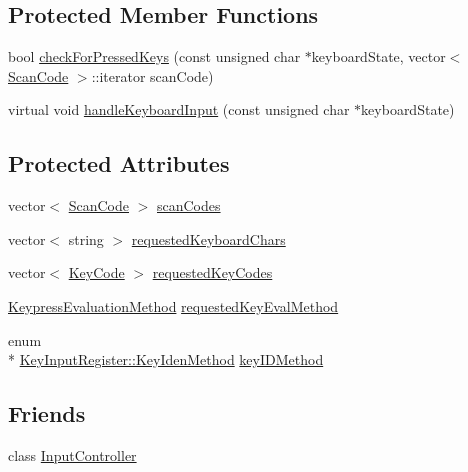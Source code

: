 \subsection*{Protected Member Functions}
\begin{DoxyCompactItemize}
\item 
bool \hyperlink{class_key_input_register_a0e5993cb2e93f288a4acf7d34da6edad}{check\-For\-Pressed\-Keys} (const unsigned char $\ast$keyboard\-State, vector$<$ \hyperlink{_input_8hpp_ab11de2748648ed8559e324a4b8dfb2da}{Scan\-Code} $>$\-::iterator scan\-Code)
\item 
virtual void \hyperlink{class_key_input_register_a076a886cd83efe7d7aaa11f670d75e61}{handle\-Keyboard\-Input} (const unsigned char $\ast$keyboard\-State)
\end{DoxyCompactItemize}
\subsection*{Protected Attributes}
\begin{DoxyCompactItemize}
\item 
vector$<$ \hyperlink{_input_8hpp_ab11de2748648ed8559e324a4b8dfb2da}{Scan\-Code} $>$ \hyperlink{class_key_input_register_abc2af3b54d196eda9e64fdcd6da118d0}{scan\-Codes}
\item 
vector$<$ string $>$ \hyperlink{class_key_input_register_a6ff79253202f3106320ed21e9f3eb803}{requested\-Keyboard\-Chars}
\item 
vector$<$ \hyperlink{_input_8hpp_ad39c2e59d8cf6782d7ab90b73c0d0ada}{Key\-Code} $>$ \hyperlink{class_key_input_register_a15cc8379e648634a63e1bedd645d03c3}{requested\-Key\-Codes}
\item 
\hyperlink{_input_8hpp_ac32d0351518cb71146a1cd777bc4fc91}{Keypress\-Evaluation\-Method} \hyperlink{class_key_input_register_a99a156d91abafbd8a1f191d15158d1ba}{requested\-Key\-Eval\-Method}
\item 
enum \\*
\hyperlink{class_key_input_register_a21a7be17fdf11de9736f801ed23b3d5d}{Key\-Input\-Register\-::\-Key\-Iden\-Method} \hyperlink{class_key_input_register_adf60b0b21fcd0b52bf3c505528519b47}{key\-I\-D\-Method}
\end{DoxyCompactItemize}
\subsection*{Friends}
\begin{DoxyCompactItemize}
\item 
class \hyperlink{class_key_input_register_a083d5a8d8c2dd3a28d1f55d2965db0ab}{Input\-Controller}
\end{DoxyCompactItemize}


